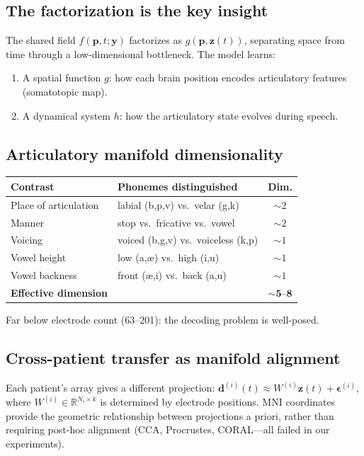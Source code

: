 \documentclass[11pt,letterpaper]{article}
\newcommand{\bfp}{\mathbf{p}}
\newcommand{\bfz}{\mathbf{z}}
\newcommand{\bfy}{\mathbf{y}}
\newcommand{\bfd}{\mathbf{d}}
\newcommand{\R}{\mathbb{R}}
\begin{document}
\subsection{The factorization is the key insight}

The shared field $f(\bfp, t; \bfy)$ factorizes as $g(\bfp, \bfz(t))$, separating space from time through a low-dimensional bottleneck. The model learns:
\begin{enumerate}[leftmargin=2em]
\item A spatial function $g$: how each brain position encodes articulatory features (somatotopic map).
\item A dynamical system $h$: how the articulatory state evolves during speech.
\end{enumerate}

\subsection{Articulatory manifold dimensionality}

\begin{table}[h]
\centering\small
\begin{tabular}{@{}llc@{}}
\toprule
\textbf{Contrast} & \textbf{Phonemes distinguished} & \textbf{Dim.} \\
\midrule
Place of articulation & labial (b,p,v) vs.\ velar (g,k) & ${\sim}2$ \\
Manner & stop vs.\ fricative vs.\ vowel & ${\sim}2$ \\
Voicing & voiced (b,g,v) vs.\ voiceless (k,p) & ${\sim}1$ \\
Vowel height & low (a,\ae) vs.\ high (i,u) & ${\sim}1$ \\
Vowel backness & front (\ae,i) vs.\ back (a,u) & ${\sim}1$ \\
\midrule
\textbf{Effective dimension} & & $\mathbf{{\sim}5\text{--}8}$ \\
\bottomrule
\end{tabular}
\end{table}

\noindent Far below electrode count (63--201): the decoding problem is well-posed.

\subsection{Cross-patient transfer as manifold alignment}

Each patient's array gives a different projection: $\bfd^{(i)}(t) \approx W^{(i)} \bfz(t) + \boldsymbol{\epsilon}^{(i)}$, where $W^{(i)} \in \R^{N_i \times k}$ is determined by electrode positions. MNI coordinates provide the geometric relationship between projections a priori, rather than requiring post-hoc alignment (CCA, Procrustes, CORAL---all failed in our experiments).
\end{document}
